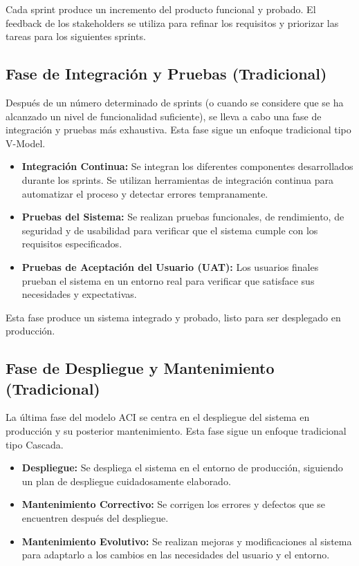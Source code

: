 \documentclass[12pt, spanish]{article}
\begin{document}
Cada sprint produce un incremento del producto funcional y probado.  El feedback de los stakeholders se utiliza para refinar los requisitos y priorizar las tareas para los siguientes sprints.

\subsection*{Fase de Integración y Pruebas (Tradicional)}

Después de un número determinado de sprints (o cuando se considere que se ha alcanzado un nivel de funcionalidad suficiente), se lleva a cabo una fase de integración y pruebas más exhaustiva.  Esta fase sigue un enfoque tradicional tipo V-Model.

\begin{itemize}
    \item \textbf{Integración Continua:}  Se integran los diferentes componentes desarrollados durante los sprints.  Se utilizan herramientas de integración continua para automatizar el proceso y detectar errores tempranamente.
    \item \textbf{Pruebas del Sistema:}  Se realizan pruebas funcionales, de rendimiento, de seguridad y de usabilidad para verificar que el sistema cumple con los requisitos especificados.
    \item \textbf{Pruebas de Aceptación del Usuario (UAT):}  Los usuarios finales prueban el sistema en un entorno real para verificar que satisface sus necesidades y expectativas.
\end{itemize}

Esta fase produce un sistema integrado y probado, listo para ser desplegado en producción.

\subsection*{Fase de Despliegue y Mantenimiento (Tradicional)}

La última fase del modelo ACI se centra en el despliegue del sistema en producción y su posterior mantenimiento.  Esta fase sigue un enfoque tradicional tipo Cascada.

\begin{itemize}
    \item \textbf{Despliegue:} Se despliega el sistema en el entorno de producción, siguiendo un plan de despliegue cuidadosamente elaborado.
    \item \textbf{Mantenimiento Correctivo:} Se corrigen los errores y defectos que se encuentren después del despliegue.
    \item \textbf{Mantenimiento Evolutivo:} Se realizan mejoras y modificaciones al sistema para adaptarlo a los cambios en las necesidades del usuario y el entorno.
\end{itemize}
\end{document}
